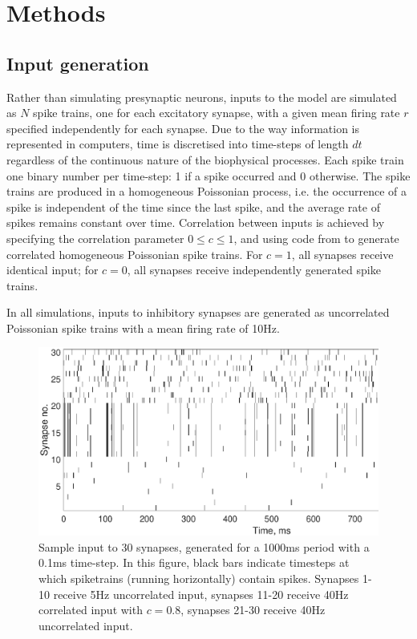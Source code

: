 \documentclass[a4paper,12pt]{report}
\theoremstyle{definition}
\begin{document}




\chapter{Methods}

\section{Input generation}
Rather than simulating presynaptic neurons, inputs to the model are simulated as $N$ spike trains, one for each excitatory synapse, with a given mean firing rate $r$ specified independently for each synapse. Due to the way information is represented in computers, time is discretised into time-steps of length $dt$ regardless of the continuous nature of the biophysical processes. Each spike train one binary number per time-step: 1 if a spike occurred and 0 otherwise. The spike trains are produced in a homogeneous Poissonian process, i.e. the occurrence of a spike is independent of the time since the last spike, and the average rate of spikes remains constant over time.
Correlation between inputs is achieved by specifying the correlation parameter $0 \leq c \leq 1$, and using code from \cite{macke2009} to generate correlated homogeneous Poissonian spike trains. For $c=1$, all synapses receive identical input; for $c=0$, all synapses receive independently generated spike trains.

In all simulations, inputs to inhibitory synapses are generated as uncorrelated Poissonian spike trains with a mean firing rate of 10Hz.

\begin{figure}[h]
    \includegraphics[width=\textwidth]{figures/methods_sample_input.eps}
    \caption{Sample input to 30 synapses, generated for a 1000ms period with a 0.1ms time-step. In this figure, black bars indicate timesteps at which spiketrains (running horizontally) contain spikes. Synapses 1-10 receive 5Hz uncorrelated input, synapses 11-20 receive 40Hz correlated input with $c=0.8$, synapses 21-30 receive 40Hz uncorrelated input.}
    \label{fig:methods_sample_input}
\end{figure}
\end{document}
